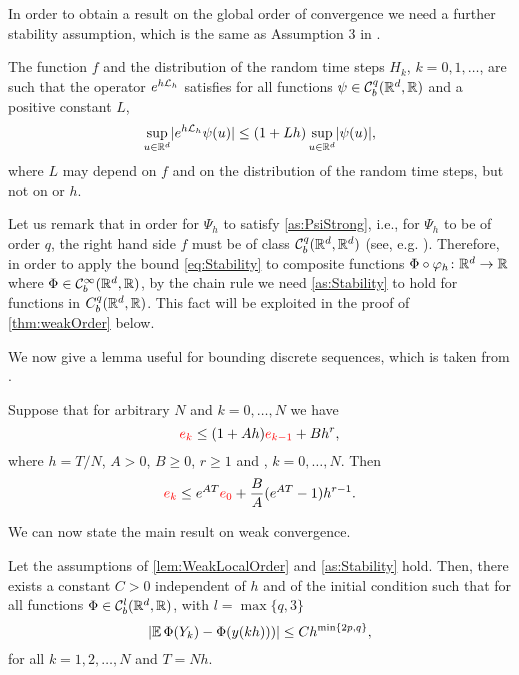 \documentclass[10pt]{article}
\begin{document}
In order to obtain a result on the global order of convergence we need a further stability assumption, which is the same as Assumption 3 in \cite{CGS17}.
\begin{assumption}\label{as:Stability} The function $f$ and the distribution of the random time steps $H_k$, $k = 0, 1, \ldots$, are such that the operator $e^{h\mathcal{L}_h}$ satisfies for all functions $\psi\in \mathcal C^q_b(\mathbb{R}^d, \mathbb{R})$ and a positive constant $L$, 
	\begin{equation}\label{eq:Stability}
		\sup_{u\in\mathbb{R}^d} \lvert e^{h\mathcal{L}_h}\psi(u)\rvert \leq (1 + Lh)\sup_{u\in\mathbb{R}^d}\lvert\psi(u)\rvert,
	\end{equation}
	where $L$ may depend on $f$ and on the distribution of the random time steps, but not on \corr{$\psi$} or $h$.
\end{assumption}
\begin{remark} Let us remark that in order for $\Psi_h$ to satisfy \cref{as:PsiStrong}, i.e., for $\Psi_h$ to be of order $q$, the right hand side $f$ must be of class $\mathcal C_b^q(\mathbb{R}^d, \mathbb{R}^d)$ (see, e.g. \cite[Theorem II.3.1]{HNW93}). Therefore, in order to apply the bound \eqref{eq:Stability} to composite functions $\Phi \circ \varphi_h \colon \mathbb{R}^d \to \mathbb{R}$ where $\Phi \in \mathcal C^\infty_b(\mathbb{R}^d, \mathbb{R})$, by the chain rule we need \cref{as:Stability} to hold for functions in $C^q_b(\mathbb{R}^d, \mathbb{R})$. This fact will be exploited in the proof of \cref{thm:weakOrder} below.
\end{remark}
We now give a lemma useful for bounding discrete sequences, which is taken from \cite[Lemma 1.6]{MiT04}.
\begin{lemma}\label{lem:RecurrenceBound} Suppose that for arbitrary $N$ and $k = 0, \ldots, N$ we have
		\begin{equation}
		{\color{red}e_k} \leq (1 + Ah) {\color{red}e_{k-1}} + Bh^r,
		\end{equation}
		where $h = T / N$, $A > 0$, $B \geq 0$, $r \geq 1$ and , $k = 0, \ldots, N$. Then
		\begin{equation}
		{\color{red}e_k} \leq e^{AT}{\color{red}e_0} + \frac{B}{A}(e^{AT} - 1) h^{r-1}.
		\end{equation}
\end{lemma}

 We can now state the main result on weak convergence. 

\begin{theorem}\label{thm:weakOrder} Let the assumptions of \cref{lem:WeakLocalOrder} and \cref{as:Stability} hold. Then, there exists a constant $C > 0$ independent of $h$ and of the initial condition such that for all functions $\Phi \in \mathcal C_b^l(\mathbb{R}^d,\mathbb{R})$, with $l = \max\{q, 3\}$
	\begin{equation}\label{eq:weakOrder}
		\lvert\operatorname{\mathbb{E}}\Phi(Y_k) - \Phi(y(kh)))\rvert \leq Ch^{\min\{2p, q\}},
	\end{equation}
	for all $k = 1, 2, \ldots, N$ and $T = Nh$.
\end{theorem}
	
\end{document}
